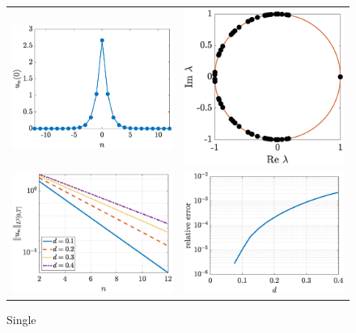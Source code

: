 \documentclass[12pt,reqno]{amsart}
\begin{document}
\begin{figure}
	\begin{center}
	\begin{tabular}{cc}
	\includegraphics[width=7.5cm]{singleun0.eps} &
	\includegraphics[width=7.5cm]{singlespec.eps} \\ 
	\includegraphics[width=7.5cm]{singledecay.eps} &
	\includegraphics[width=7.5cm]{singledecayerror.eps}
	\end{tabular}
	\end{center}
	\caption{Single}
	\label{fig:single}
\end{figure}
\end{document}
